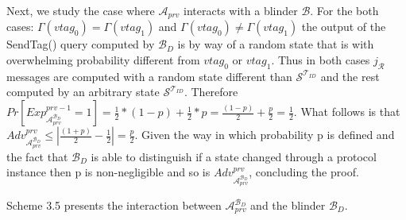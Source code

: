     Next, we study the case where $\mathcal{A}_{prv}$ interacts with a blinder $\mathcal{B}$. For the both cases: $\Gamma(vtag_0) = \Gamma(vtag_1)$ and 
    $\Gamma(vtag_0) \neq \Gamma(vtag_1)$ the output of the SendTag() query computed by $\mathcal{B}_D$ is by way of a random state that is
    with overwhelming probability different from $vtag_0$ or $vtag_1$. Thus in both cases $j_\mathcal{R}$ messages are computed with a random 
    state different than $\mathcal{S}^{\mathcal{T}_{ID}}$ and the rest computed by an arbitrary state $\mathcal{S}^{\mathcal{T}_{ID}}$. Therefore 
    $Pr[Exp_{\mathcal{A}_{prv}^{\mathcal{B}_D}}^{prv-1} = 1] = \frac{1}{2}*(1-p)+\frac{1}{2}*p = \frac{(1-p)}{2}+\frac{p}{2} = \frac{1}{2}.$
    What follows is that $Adv_{\mathcal{A}_{prv}^{\mathcal{B}_D}}^{prv} \leq | \frac{(1+p)}{2} - \frac{1}{2} | = \frac{p}{2}$. Given the way in 
    which probability p is defined and the fact that $\mathcal{B}_D$ is able to distinguish if a state changed through a protocol instance then
    p is non-negligible and so is $Adv_{\mathcal{A}_{prv}^{\mathcal{B}_D}}^{prv}$, concluding the proof. 

    Scheme 3.5 presents the interaction between $\mathcal{A}_{prv}^{\mathcal{B}_D}$ and the blinder $\mathcal{B}_D$.

